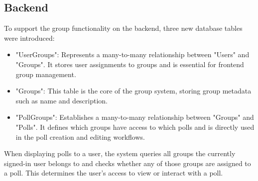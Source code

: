 \documentclass[a4paper,12pt]{report}
\begin{document}
\subsection{Backend}

To support the group functionality on the backend, three new database tables were introduced:

\begin{itemize}
	\item "UserGroups": Represents a many-to-many relationship between "Users" and "Groups". It stores user assignments to groups and is essential for frontend group management.
	\item "Groups": This table is the core of the group system, storing group metadata such as name and description.
	\item "PollGroups": Establishes a many-to-many relationship between "Groups" and "Polls". It defines which groups have access to which polls and is directly used in the poll creation and editing workflows. \\
\end{itemize}
When displaying polls to a user, the system queries all groups the currently signed-in user belongs to and checks whether any of those groups are assigned to a poll. This determines the user's access to view or interact with a poll. \\
\end{document}
